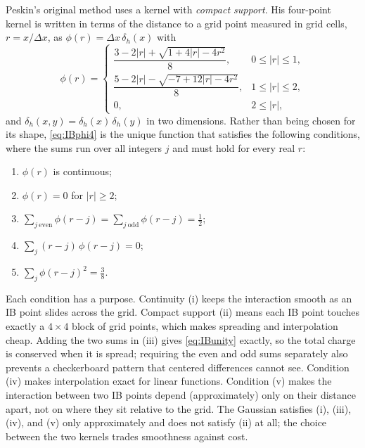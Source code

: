 Peskin's original method uses a kernel with \emph{compact support}. His
four-point kernel \parencite{peskin2002} is written in terms of the
distance to a grid point measured in grid cells, $r = x/\Delta x$, as
$\phi(r) = \Delta x\,\delta_h(x)$ with
\begin{equation}
  \phi(r) =
  \begin{cases}
    \dfrac{3 - 2|r| + \sqrt{1 + 4|r| - 4r^2}}{8}, & 0 \leq |r| \leq 1,\\[3mm]
    \dfrac{5 - 2|r| - \sqrt{-7 + 12|r| - 4r^2}}{8}, & 1 \leq |r| \leq 2,\\[3mm]
    0, & 2 \leq |r|,
  \end{cases}
  \label{eq:IBphi4}
\end{equation}
and $\delta_h(x,y) = \delta_h(x)\,\delta_h(y)$ in two dimensions. Rather
than being chosen for its shape, \eqref{eq:IBphi4} is the unique function
that satisfies the following conditions, where the sums run over all
integers $j$ and must hold for every real $r$:
\begin{enumerate}[label=(\roman*)]
  \item $\phi(r)$ is continuous;
  \item $\phi(r) = 0$ for $|r| \geq 2$;
  \item $\displaystyle\sum_{j\ \mathrm{even}} \phi(r - j)
        = \sum_{j\ \mathrm{odd}} \phi(r - j) = \frac{1}{2}$;
  \item $\displaystyle\sum_{j} (r - j)\,\phi(r - j) = 0$;
  \item $\displaystyle\sum_{j} \phi(r - j)^2 = \frac{3}{8}$.
\end{enumerate}
Each condition has a purpose. Continuity (i) keeps the interaction smooth
as an IB point slides across the grid. Compact support (ii) means each IB
point touches exactly a $4 \times 4$ block of grid points, which makes
spreading and interpolation cheap. Adding the two sums in (iii) gives
\eqref{eq:IBunity} exactly, so the total charge is conserved when it is
spread; requiring the even and odd sums separately also prevents a
checkerboard pattern that centered differences cannot see. Condition (iv)
makes interpolation exact for linear functions. Condition (v) makes the
interaction between two IB points depend (approximately) only on their
distance apart, not on where they sit relative to the grid. The Gaussian
satisfies (i), (iii), (iv), and (v) only approximately and does not
satisfy (ii) at all; the choice between the two kernels trades smoothness
against cost.

